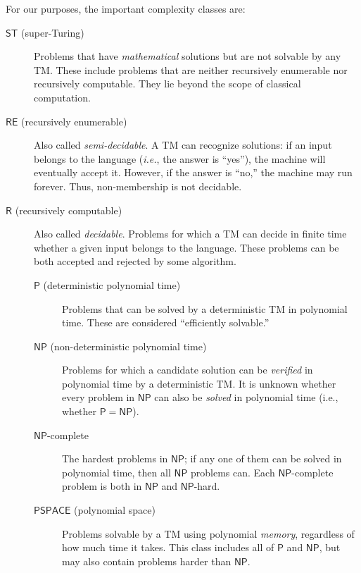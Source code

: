 \documentclass[]{interact}
\theoremstyle{plain}%
\theoremstyle{definition}
\theoremstyle{remark}
\begin{document}
 For our purposes, the important complexity classes are:
 
 \begin{description}
\item[$\mathsf{ST}$ (super-Turing)] Problems that have \emph{mathematical} solutions but are not solvable by any TM. These include problems that are neither recursively enumerable nor recursively computable. They lie beyond the scope of classical computation.
  
\item[$\mathsf{RE}$ (recursively enumerable)] Also called \emph{semi-decidable}. A TM can recognize solutions: if an input belongs to the language (\emph{i.e.}, the answer is ``yes''), the machine will eventually accept it. However, if the answer is ``no,'' the machine may run forever. Thus, non-membership is not decidable.

\item[$\mathsf{R}$ (recursively computable)] Also called \emph{decidable}. Problems for which a TM can decide in finite time whether a given input belongs to the language. These problems can be both accepted and rejected by some algorithm.

\begin{description}
\item[$\mathsf{P}$ (deterministic polynomial time)] Problems that can be solved by a deterministic TM in polynomial time. These are considered ``efficiently solvable.''

\item[$\mathsf{NP}$ (non-deterministic polynomial time)] Problems for which a candidate solution can be \emph{verified} in polynomial time by a deterministic TM. It is unknown whether every problem in $\mathsf{NP}$ can also be \emph{solved} in polynomial time (i.e., whether $\mathsf{P} = \mathsf{NP}$).

\item[$\mathsf{NP}$-complete] The hardest problems in $\mathsf{NP}$; if any one of them can be solved in polynomial time, then all $\mathsf{NP}$ problems can. Each $\mathsf{NP}$-complete problem is both in $\mathsf{NP}$ and $\mathsf{NP}$-hard.

\item[$\mathsf{PSPACE}$ (polynomial space)] Problems solvable by a TM using polynomial \emph{memory}, regardless of how much time it takes. This class includes all of $\mathsf{P}$ and $\mathsf{NP}$, but may also contain problems harder than $\mathsf{NP}$.

\end{description}
\end{description}
\end{document}
